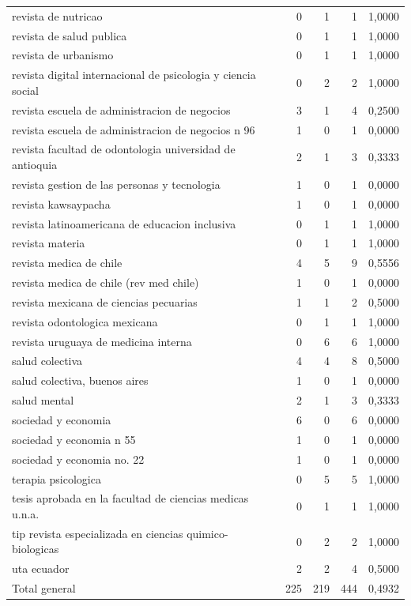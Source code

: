 \begin{longtable}{lrrrr}
revista de nutricao & 0 & 1 & 1 & 1,0000\\
revista de salud publica & 0 & 1 & 1 & 1,0000\\
revista de urbanismo & 0 & 1 & 1 & 1,0000\\
revista digital internacional de psicologia y ciencia social & 0 & 2 & 2 & 1,0000\\
revista escuela de administracion de negocios & 3 & 1 & 4 & 0,2500\\
revista escuela de administracion de negocios n 96 & 1 & 0 & 1 & 0,0000\\
revista facultad de odontologia universidad de antioquia & 2 & 1 & 3 & 0,3333\\
revista gestion de las personas y tecnologia & 1 & 0 & 1 & 0,0000\\
revista kawsaypacha & 1 & 0 & 1 & 0,0000\\
revista latinoamericana de educacion inclusiva & 0 & 1 & 1 & 1,0000\\
revista materia & 0 & 1 & 1 & 1,0000\\
revista medica de chile & 4 & 5 & 9 & 0,5556\\
revista medica de chile (rev med chile) & 1 & 0 & 1 & 0,0000\\
revista mexicana de ciencias pecuarias & 1 & 1 & 2 & 0,5000\\
revista odontologica mexicana & 0 & 1 & 1 & 1,0000\\
revista uruguaya de medicina interna & 0 & 6 & 6 & 1,0000\\
salud colectiva & 4 & 4 & 8 & 0,5000\\
salud colectiva, buenos aires & 1 & 0 & 1 & 0,0000\\
salud mental & 2 & 1 & 3 & 0,3333\\
sociedad y economia & 6 & 0 & 6 & 0,0000\\
sociedad y economia n 55 & 1 & 0 & 1 & 0,0000\\
sociedad y economia no. 22 & 1 & 0 & 1 & 0,0000\\
terapia psicologica & 0 & 5 & 5 & 1,0000\\
tesis aprobada en la facultad de ciencias medicas u.n.a. & 0 & 1 & 1 & 1,0000\\
tip revista especializada en ciencias quimico-biologicas & 0 & 2 & 2 & 1,0000\\
uta ecuador & 2 & 2 & 4 & 0,5000\\
Total general & 225 & 219 & 444 & 0,4932\\
\bottomrule
\end{longtable}
